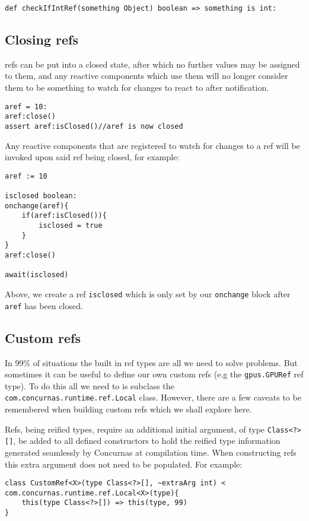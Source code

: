 \documentclass[conc-doc]{subfiles}
\begin{document}
\begin{lstlisting}
def checkIfIntRef(something Object) boolean => something is int:
\end{lstlisting}

\subsection{Closing refs}
refs can be put into a closed state, after which no further values may be assigned to them, and any reactive components which use them will no longer consider them to be something to watch for changes to react to after notification.

\begin{lstlisting}
aref = 10:
aref:close()
assert aref:isClosed()//aref is now closed
\end{lstlisting}

Any reactive components that are registered to watch for changes to a ref will be invoked upon said ref being closed, for example:

\begin{lstlisting}
aref := 10

isclosed boolean:
onchange(aref){
	if(aref:isClosed()){
		isclosed = true
	}
}
aref:close()

await(isclosed)
\end{lstlisting}

Above, we create a ref \lstinline{isclosed} which is only set by our \lstinline{onchange} block after \lstinline{aref} has been closed.

\subsection{Custom refs}
In 99\% of situations the built in ref types are all we need to solve problems. But sometimes it can be useful to define our own custom refs (e.g the \lstinline{gpus.GPURef} ref type). To do this all we need to is subclass the \lstinline{com.concurnas.runtime.ref.Local} class. However, there are a few caveats to be remembered when building custom refs which we shall explore here. 

Refs, being reified types, require an additional initial argument, of type \lstinline{Class<?>[]}, be added to all defined constructors to hold the reified type information generated seamlessly by Concurnas at compilation time. When constructing refs this extra argument does not need to be populated. For example:

\begin{lstlisting}
class CustomRef<X>(type Class<?>[], ~extraArg int) < com.concurnas.runtime.ref.Local<X>(type){
	this(type Class<?>[]) => this(type, 99)
}
\end{lstlisting}
\end{document}

